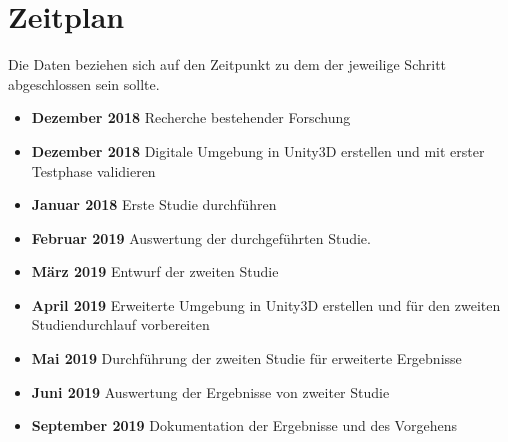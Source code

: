 \documentclass[a4paper, 11pt]{article}
\begin{document}
\section*{Zeitplan}
Die Daten beziehen sich auf den Zeitpunkt zu dem der jeweilige Schritt abgeschlossen sein sollte.
\begin{itemize}
    \item \textbf{Dezember 2018} Recherche bestehender Forschung
    \item \textbf{Dezember 2018} Digitale Umgebung in Unity3D erstellen und mit erster Testphase validieren
    \item \textbf{Januar 2018} Erste Studie durchführen
    \item \textbf{Februar 2019} Auswertung der durchgeführten Studie.
    \item \textbf{März 2019} Entwurf der zweiten Studie
    \item \textbf{April 2019} Erweiterte Umgebung in Unity3D erstellen und für den zweiten Studiendurchlauf vorbereiten
    \item \textbf{Mai 2019} Durchführung der zweiten Studie für erweiterte Ergebnisse
    \item \textbf{Juni 2019} Auswertung der Ergebnisse von zweiter Studie
    \item \textbf{September 2019} Dokumentation der Ergebnisse und des Vorgehens
\end{itemize}
\end{document}
